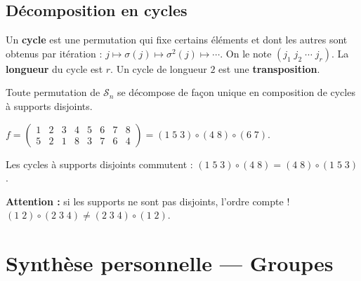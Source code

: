 \subsection{Décomposition en cycles}

\begin{defbox}
Un \textbf{cycle} est une permutation qui fixe certains éléments et dont les autres sont obtenus par itération : $j \mapsto \sigma(j) \mapsto \sigma^2(j) \mapsto \cdots$. On le note $(j_1 \; j_2 \; \cdots \; j_r)$. La \textbf{longueur} du cycle est $r$. Un cycle de longueur $2$ est une \textbf{transposition}.
\end{defbox}

\begin{thmbox}
Toute permutation de $\mathcal{S}_n$ se décompose de façon unique en composition de cycles à supports disjoints.
\end{thmbox}

\begin{exbox}
$f = \begin{pmatrix} 1 & 2 & 3 & 4 & 5 & 6 & 7 & 8 \\ 5 & 2 & 1 & 8 & 3 & 7 & 6 & 4 \end{pmatrix} = (1\;5\;3) \circ (4\;8) \circ (6\;7)$.

Les cycles à supports disjoints commutent : $(1\;5\;3) \circ (4\;8) = (4\;8) \circ (1\;5\;3)$.

\textbf{Attention :} si les supports ne sont pas disjoints, l'ordre compte ! $(1\;2) \circ (2\;3\;4) \neq (2\;3\;4) \circ (1\;2)$.
\end{exbox}


\section{Synthèse personnelle --- Groupes}


